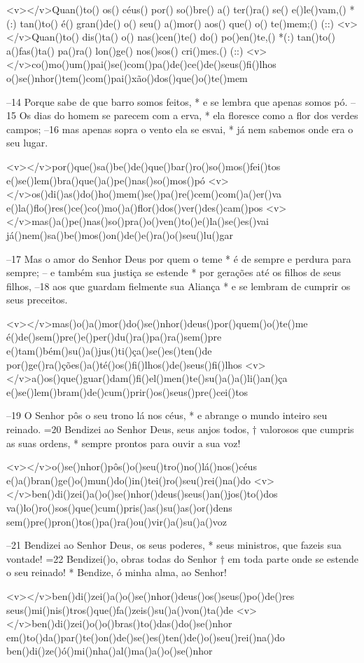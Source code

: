 <v></v>Quan()to() os() céus() por() so()bre() a() ter()ra() se() e()le()vam,() *(:)
tan()to() é() gran()de() o() seu() a()mor() aos() que() o() te()mem;() (::)
<v></v>Quan()to() dis()ta() o() nas()cen()te() do() po()en()te,() *(:)
tan()to() a()fas()ta() pa()ra() lon()ge() nos()sos() cri()mes.() (::)
<v></v>co()mo()um()pai()se()com()pa()de()ce()de()seus()fi()lhos
o()se()nhor()tem()com()pai()xão()dos()que()o()te()mem

–14 Porque sabe de que barro somos feitos, *
e se lembra que apenas somos pó.
–15 Os dias do homem se parecem com a erva, *
ela floresce como a flor dos verdes campos;
–16 mas apenas sopra o vento ela se esvai, *
já nem sabemos onde era o seu lugar.

<v></v>por()que()sa()be()de()que()bar()ro()so()mos()fei()tos
e()se()lem()bra()que()a()pe()nas()so()mos()pó
<v></v>os()di()as()do()ho()mem()se()pa()re()cem()com()a()er()va
e()la()flo()res()ce()co()mo()a()flor()dos()ver()des()cam()pos
<v></v>mas()a()pe()nas()so()pra()o()ven()to()e()la()se()es()vai
já()nem()sa()be()mos()on()de()e()ra()o()seu()lu()gar

–17 Mas o amor do Senhor Deus por quem o teme *
é de sempre e perdura para sempre;
– e também sua justiça se estende *
por gerações até os filhos de seus filhos,
–18 aos que guardam fielmente sua Aliança *
e se lembram de cumprir os seus preceitos.

<v></v>mas()o()a()mor()do()se()nhor()deus()por()quem()o()te()me
é()de()sem()pre()e()per()du()ra()pa()ra()sem()pre
e()tam()bém()su()a()jus()ti()ça()se()es()ten()de
por()ge()ra()ções()a()té()os()fi()lhos()de()seus()fi()lhos
<v></v>a()os()que()guar()dam()fi()el()men()te()su()a()a()li()an()ça
e()se()lem()bram()de()cum()prir()os()seus()pre()cei()tos

–19 O Senhor pôs o seu trono lá nos céus, *
e abrange o mundo inteiro seu reinado.
=20 Bendizei ao Senhor Deus, seus anjos todos, †
valorosos que cumpris as suas ordens, *
sempre prontos para ouvir a sua voz!

<v></v>o()se()nhor()pôs()o()seu()tro()no()lá()nos()céus
e()a()bran()ge()o()mun()do()in()tei()ro()seu()rei()na()do
<v></v>ben()di()zei()a()o()se()nhor()deus()seus()an()jos()to()dos
va()lo()ro()sos()que()cum()pris()as()su()as()or()dens
sem()pre()pron()tos()pa()ra()ou()vir()a()su()a()voz

–21 Bendizei ao Senhor Deus, os seus poderes, *
seus ministros, que fazeis sua vontade!
=22 Bendizei()o, obras todas do Senhor †
em toda parte onde se estende o seu reinado! *
Bendize, ó minha alma, ao Senhor!

<v></v>ben()di()zei()a()o()se()nhor()deus()os()seus()po()de()res
seus()mi()nis()tros()que()fa()zeis()su()a()von()ta()de
<v></v>ben()di()zei()o()o()bras()to()das()do()se()nhor
em()to()da()par()te()on()de()se()es()ten()de()o()seu()rei()na()do
ben()di()ze()ó()mi()nha()al()ma()a()o()se()nhor